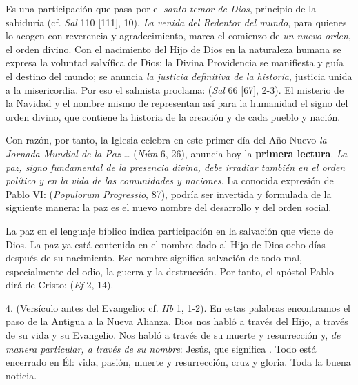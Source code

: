 \begin{body}
	Es una participación que pasa por el \emph{santo temor de Dios}, principio de la sabiduría (cf. \emph{Sal} 110 {[}111{]}, 10). \emph{La venida del Redentor del mundo}, para quienes lo acogen con reverencia y agradecimiento, marca el comienzo de \emph{un nuevo orden}, el orden divino. Con el nacimiento del Hijo de Dios en la naturaleza humana se expresa la voluntad salvífica de Dios; la Divina Providencia se manifiesta y guía el destino del mundo; se anuncia \emph{la justicia definitiva de la historia}, justicia unida a la misericordia. Por eso el salmista proclama:  (\emph{Sal} 66 {[}67{]}, 2-3). El misterio de la Navidad y el nombre mismo de  representan así para la humanidad el signo del orden divino, que contiene la historia de la creación y de cada pueblo y nación.
	
	Con razón, por tanto, la Iglesia celebra en este primer día del Año Nuevo \emph{la Jornada Mundial de la Paz} \ldots{}  (\emph{Núm} 6, 26), anuncia hoy la \textbf{primera lectura}. \emph{La paz, signo fundamental de la presencia divina, debe irradiar también en el orden político y en la vida de las comunidades y naciones}. La conocida expresión de Pablo VI:  (\emph{Populorum Progressio}, 87), podría ser invertida y formulada de la siguiente manera: la paz es el nuevo nombre del desarrollo y del orden social.
	
	La paz en el lenguaje bíblico indica participación en la salvación que viene de Dios. La paz ya está contenida en el nombre dado al Hijo de Dios ocho días después de su nacimiento. Ese nombre significa salvación de todo mal, especialmente del odio, la guerra y la destrucción. Por tanto, el apóstol Pablo dirá de Cristo:  (\emph{Ef} 2, 14).
	
	4.  (Versículo antes del Evangelio: cf. \emph{Hb} 1, 1-2). En estas palabras encontramos el paso de la Antigua a la Nueva Alianza. Dios nos habló a través del Hijo, a través de su vida y su Evangelio. Nos habló a través de su muerte y resurrección y, \emph{de manera particular, a través de su nombre}: Jesús, que significa . Todo está encerrado en Él: vida, pasión, muerte y resurrección, cruz y gloria. Toda la buena noticia.
	

\end{body}
